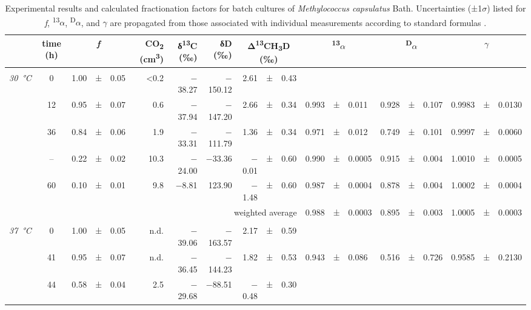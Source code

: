 

\begin{sidewaystable}\centering
	\begin{threeparttable}
		\caption[Experimental results and calculated fractionation
		factors for batch cultures of \emph{M.\ capsulatus}]{Experimental results and calculated fractionation
		factors for batch cultures of \emph{Methylococcus capsulatus} Bath.
		Uncertainties (±1$\sigma$) listed for \emph{f}, \textsuperscript{13}$\alpha$,
		\textsuperscript{D}$\alpha$, and $\gamma$ are propagated from those associated with
		individual measurements according to standard formulas \parencite{Ku_1969_JResNBS}.}
		\label{tab:4:1}
		\begin{tabular}{lc r@{\;}c@{\;}l r r r r@{\;}c@{\;}l r@{\;}c@{\;}l r@{\;}c@{\;}l r@{\;}c@{\;}l}
			\toprule
			& time (h) & \multicolumn{3}{c}{\emph{f}} & CO\textsubscript{2}
			(cm\textsuperscript{3})\tnote{a} & δ\textsuperscript{13}C
			(‰)\tnote{c} & δD (‰)\tnote{c} & \multicolumn{3}{c}{
			Δ\textsuperscript{13}CH\textsubscript{3}D (‰)\tnote{c} } &
			\multicolumn{3}{c}{ \textsuperscript{13}$\alpha$ } & \multicolumn{3}{c}{ \textsuperscript{D}$\alpha$ } & \multicolumn{3}{c}{ $\gamma$ }\tabularnewline
			\midrule
			& & & & & & & & & & & & & & & & & & &\tabularnewline
			\emph{30~°C} & 0 & 1.00 & ± & 0.05\tnote{b} & \textless{}0.2 &
			$-$38.27 & $-$150.12 & 2.61 & ± & 0.43 & & & & & & & & &\tabularnewline
			& 12 & 0.95 & ± & 0.07 & 0.6 & $-$37.94 & $-$147.20 & 2.66 & ± & 0.34 &
			0.993 & ± & 0.011 & 0.928 & ± & 0.107 & 0.9983 & ± &
			0.0130\tabularnewline
			& 36 & 0.84 & ± & 0.06 & 1.9 & $-$33.31 & $-$111.79 & 1.36 & ± & 0.34 &
			0.971 & ± & 0.012 & 0.749 & ± & 0.101 & 0.9997 & ± &
			0.0060\tabularnewline
			& --\tnote{d} & 0.22 & ± & 0.02 & 10.3 & $-$24.00 & $-$33.36 &
			$-$0.01 & ± & 0.60 & 0.990 & ± & 0.0005 & 0.915 & ± & 0.004 & 1.0010 & ± &
			0.0005\tabularnewline
			& 60 & 0.10 & ± & 0.01 & 9.8 & $-$8.81 & 123.90 & $-$1.48 & ± & 0.60 & 0.987
			& ± & 0.0004 & 0.878 & ± & 0.004 & 1.0002 & ± & 0.0004\tabularnewline \cmidrule{12-20} 
			& & & & & & & \multicolumn{4}{r}{weighted average\tnote{e}} & 0.988 & ± & 0.0003 &
			0.895 & ± & 0.003 & 1.0005 & ± & 0.0003\tabularnewline
			& & & & & & & & & & & & & & & & & & &\tabularnewline
			\emph{37~°C} & 0 & 1.00 & ± & 0.05\tnote{b} & n.d. & $-$39.06 &
			$-$163.57 & 2.17 & ± & 0.59 & & & & & & & & &\tabularnewline
			& 41 & 0.95 & ± & 0.07 & n.d. & $-$36.45 & $-$144.23 & 1.82 & ± & 0.53 &
			0.943 & ± & 0.086 & 0.516 & ± & 0.726 & 0.9585 & ± &
			0.2130\tabularnewline
			& 44 & 0.58 & ± & 0.04 & 2.5 & $-$29.68 & $-$88.51 & $-$0.48 & ± & 0.30 &

\end{tabular}
\end{threeparttable}
\end{sidewaystable}
